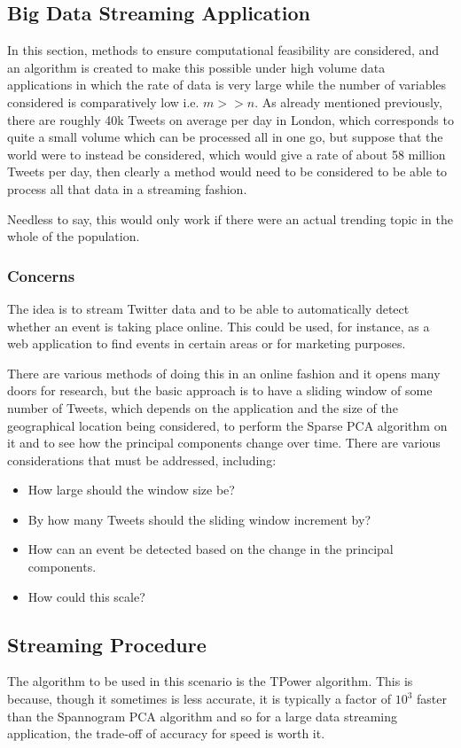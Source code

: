 \documentclass[11pt,a4paper]{article}
\begin{document}
\subsection{Big Data Streaming Application}
In this section, methods to ensure computational feasibility are considered, and an algorithm is created to make this possible under high volume data applications in which the rate of data is very large while the number of variables considered is comparatively low i.e. $m >> n$. As already mentioned previously, there are roughly 40k Tweets on average per day in London, which corresponds to quite a small volume which can be processed all in one go, but suppose that the world were to instead be considered, which would give a rate of about 58 million Tweets per day, then clearly a method would need to be considered to be able to process all that data in a streaming fashion. 

Needless to say, this would only work if there were an actual trending topic in the whole of the population. 
\subsubsection{Concerns}
The idea is to stream Twitter data and to be able to automatically detect whether an event is taking place online. This could be used, for instance, as a web application to find events in certain areas or for marketing purposes. 

There are various methods of doing this in an online fashion and it opens many doors for research, but the basic approach is to have a sliding window of some number of Tweets, which depends on the application and the size of the geographical location being considered, to perform the Sparse PCA algorithm on it and to see how the principal components change over time. There are various considerations that must be addressed, including:
\begin{itemize}
\item How large should the window size be?
\item By how many Tweets should the sliding window increment by?
\item How can an event be detected based on the change in the principal components. 
\item How could this scale?
\end{itemize}

\subsection{Streaming Procedure}
The algorithm to be used in this scenario is the TPower algorithm. This is because, though it sometimes is less accurate, it is typically a factor of $10^3$ faster than the Spannogram PCA algorithm and so for a large data streaming application, the trade-off of accuracy for speed is worth it. 
\end{document}
